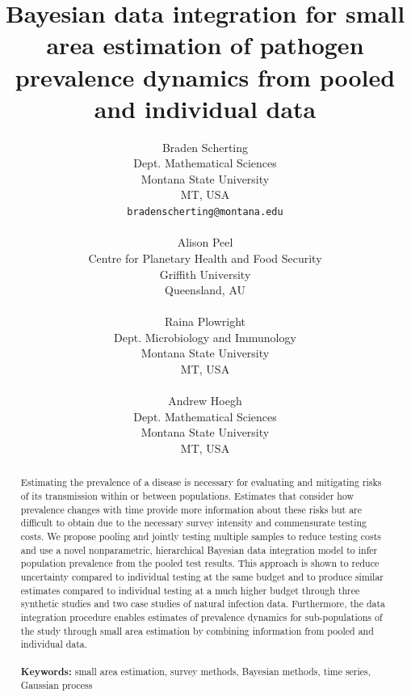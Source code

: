 \documentclass{article}
\title{Bayesian data integration for small area estimation of pathogen prevalence dynamics from pooled and individual data}
\author{
  Braden Scherting \\
  Dept. Mathematical Sciences \\
  Montana State University \\
  MT, USA \\
  \texttt{bradenscherting@montana.edu} \\
\\
  Alison Peel \\
  Centre for Planetary Health and Food Security \\
  Griffith University \\
  Queensland, AU\\
\\
  Raina Plowright \\
  Dept. Microbiology and Immunology \\
  Montana State University \\
  MT, USA\\
\\
  Andrew Hoegh \\
  Dept. Mathematical Sciences \\
  Montana State University \\
  MT, USA \\}
\begin{document}
\maketitle


\begin{abstract}
Estimating the prevalence of a disease is necessary for evaluating and mitigating risks of its transmission within or between populations. Estimates that consider how prevalence changes with time provide more information about these risks but are difficult to obtain due to the necessary survey intensity and commensurate testing costs. We propose pooling and jointly testing multiple samples to reduce testing costs and use a novel nonparametric, hierarchical Bayesian data integration model to infer population prevalence from the pooled test results. This approach is shown to reduce uncertainty compared to individual testing at the same budget and to produce similar estimates compared to individual testing at a much higher budget through three synthetic studies and two case studies of natural infection data. Furthermore, the data integration procedure enables estimates of prevalence dynamics for sub-populations of the study through small area estimation by combining information from pooled and individual data.\\
\\
{\bf Keywords:} small area estimation, survey methods, Bayesian methods, time series, Gaussian process
\end{abstract}


\end{document}
